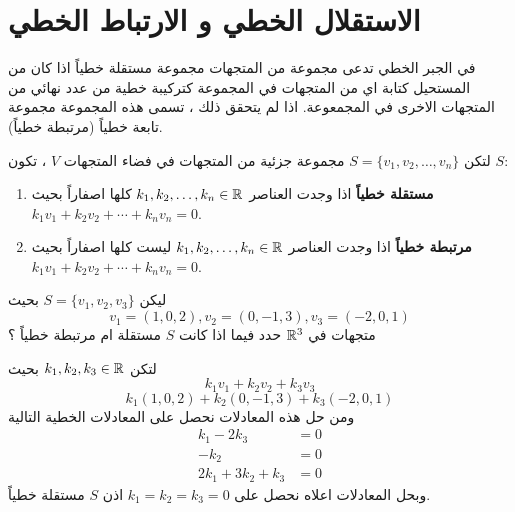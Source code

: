 \section{الاستقلال الخطي و الارتباط الخطي}
في الجبر الخطي تدعى مجموعة من المتجهات مجموعة مستقلة خطياً اذا كان من المستحيل كتابة اي من المتجهات في المجموعة كتركيبة خطية من  عدد نهائي من المتجهات الاخرى في المجمعوعة. اذا لم يتحقق ذلك ، تسمى هذه المجموعة مجموعة تابعة خطياً (مرتبطة خطياً).

\begin{definition}
	لتكن $S=\{v_1, v_2, \dots, v_n\}$ مجموعة جزئية من المتجهات في فضاء المتجهات $V$ ، تكون $S$:
	\begin{enumerate}
		\item \textbf{مستقلة خطياً} اذا وجدت العناصر $k_1, k_2, \dots, k_n\in \mathbb{R}$ كلها اصفاراً بحيث \\$k_1v_1 + k_2v_2 + \cdots + k_n v_n = 0$.
		\item \textbf{مرتبطة خطياً} اذا وجدت العناصر $k_1, k_2, \dots, k_n\in \mathbb{R}$ ليست  كلها اصفاراً بحيث \\$k_1v_1 + k_2v_2 + \cdots + k_n v_n = 0$.
	\end{enumerate}
\end{definition}

\begin{example}
	ليكن $S = \{v_1, v_2, v_3\}$ بحيث 
	\[
	v_1 = (1, 0,2), v_2 = (0,-1,3) , v_3=(-2,0,1)
	\]
	متجهات في $\mathbb{R}^3$ حدد فيما اذا كانت $S$ مستقلة ام مرتبطة خطياً ؟
\end{example}
\begin{solution}
	لتكن $k_1,k_2,k_3\in \mathbb{R}$ بحيث 
	\[
	k_1 v_1 + k_2v_2 + k_3v_3
	\]
	\[
	k_1(1,0,2) + k_2(0,-1,3) + k_3(-2,0,1)
	\]
	ومن حل هذه المعادلات نحصل على المعادلات الخطية التالية
	\begin{align*}
		k_1 -2k_3 &= 0\\
		-k_2 &= 0\\
		2k_1 + 3k_2 + k_3 &= 0
	\end{align*}
	وبحل المعادلات اعلاه نحصل على $k_1 = k_2 = k_3 = 0$
	اذن $S$ مستقلة خطياً.
\end{solution}

